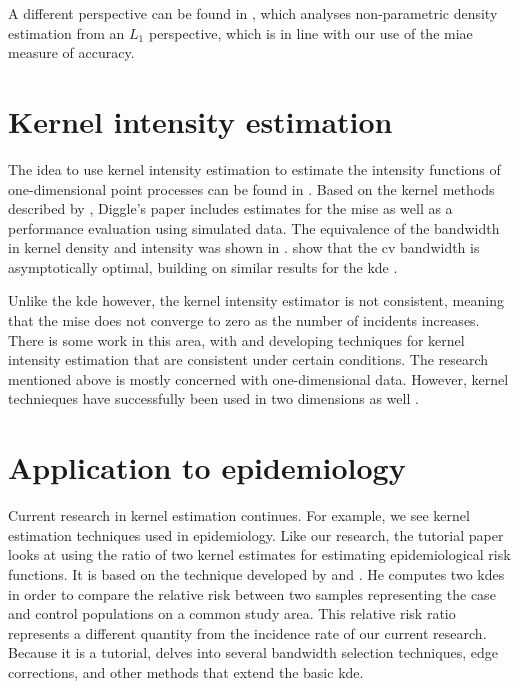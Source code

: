 A different perspective can be found in \citet{devroye1985nonparametric},
which analyses non-parametric density estimation from an $L_1$ perspective,
which is in line with our use of the \gls{miae} measure of accuracy.

\section{Kernel intensity estimation}

The idea to use \gls{kernel intensity estimation} to estimate the intensity functions of one-dimensional point processes can be found in \citet{diggle1985kernel}.
Based on the kernel methods described by \citet{rosenblatt1956remarks},
Diggle's paper includes estimates for the \gls{mise} as well as a performance evaluation using simulated data.
The equivalence of the bandwidth in kernel density and intensity was shown in \citet{diggle1988equivalence}.
 show that the \gls{cv} bandwidth is asymptotically optimal,
building on similar results for the \gls{kde} \citep{hall1983large,burman1985data,stone1984asymptotically}.

Unlike the \gls{kde} however,
the \gls{kernel intensity estimator} is not consistent,
meaning that the \gls{mise} does not converge to zero as the number of incidents increases.
There is some work in this area,
with \citet{guan2008consistent} and \citet{fuentes2016consistent} developing techniques for \gls{kernel intensity estimation} that are consistent under certain conditions.
The research mentioned above is mostly concerned with one-dimensional data.
However, kernel technieques have successfully been used in two dimensions as well \citep{scott1992multivariate}.

\section{Application to epidemiology}

Current research in kernel estimation continues.
For example, we see kernel estimation techniques used in epidemiology.
Like our research,
the tutorial paper \citet{davies2018tutorial} looks at using the ratio of two kernel estimates for estimating epidemiological risk functions.
It is based on the technique developed by \citet{bithell1990application} and \citet{bithell1991estimation}.
He computes two \glspl{kde} in order to compare the relative risk between two samples representing the case and control populations on a common study area.
This relative risk ratio represents a different quantity from the incidence rate of our current research.
Because it is a tutorial, \citet{davies2018tutorial} delves into several bandwidth selection techniques,
edge corrections,
and other methods that extend the basic \gls{kde}.

